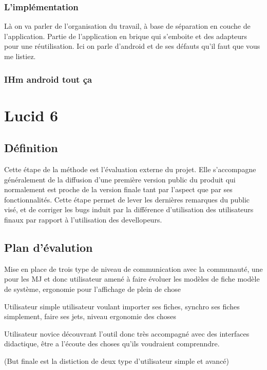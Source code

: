 \documentclass[11pt,a4paper]{article}
\begin{document}
\subsubsection{L'implémentation}

Là on va parler de l'organisation du travail, à base de séparation en couche de
l'application. Partie de l'application en brique qui s'emboite et des adapteurs
pour une réutilisation.
Ici on parle d'android et de ses défauts qu'il faut que vous me listiez. 

\subsubsection{IHm android tout ça}

\section{Lucid 6}

\subsection{Définition}

Cette étape de la méthode est l'évaluation externe du projet. Elle s'accompagne
généralement de la diffusion d'une première version public du produit qui
normalement est proche de la version finale tant par l'aspect que par ses
fonctionnalités.
Cette étape permet de lever les dernières remarques du public visé, et de
corriger les bugs induit par la différence d'utilisation des utilisateurs finaux
par rapport à l'utilisation des devellopeurs.


\subsection{Plan d'évalution}

Mise en place de trois type de niveau de communication avec la communauté,
une pour les MJ et donc utilisateur amené à faire évoluer les modèles de fiche
modèle de système, ergonomie pour l'affichage de plein de chose

Utilisateur simple utilisateur voulant importer ses fiches, synchro ses fiches
simplement, faire ses jets, niveau ergonomie des choses

Utilisateur novice découvrant l'outil donc très accompagné avec des interfaces
didactique, être a l'écoute des choses qu'ils voudraient comprenndre.

(But finale est la distiction de deux type d'utilisateur simple et avancé)
\end{document}
